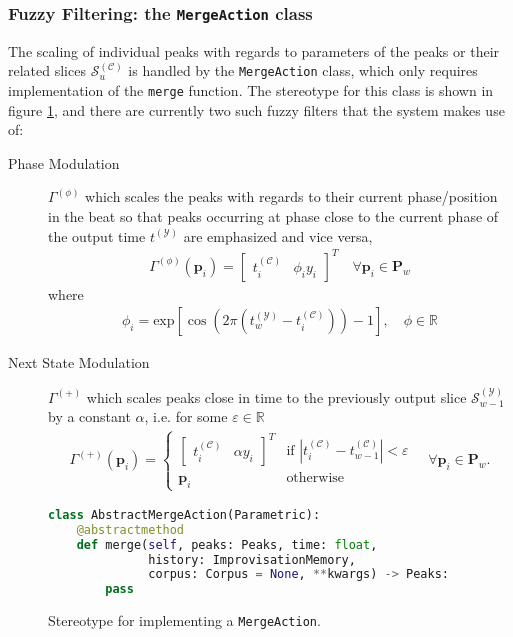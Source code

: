  
 
 \subsubsection{Fuzzy Filtering: the \texttt{MergeAction} class}\label{sec:4-main-architecture-mergeactions}
 The scaling of individual peaks with regards to parameters of the peaks or their related slices $\mathcal S^{(\mathcal C)}_u$ is handled by the \texttt{MergeAction} class, which only requires implementation of the \texttt{merge} function. The stereotype for this class is shown in figure \ref{fig:4-main-architecture-mergeaction}, and there are currently two such fuzzy filters that the system makes use of: 
\begin{description}
	\item[Phase Modulation] $\Gamma^{(\phi)}$ which scales the peaks with regards to their current phase/position in the beat so that peaks occurring at phase close to the current phase of the output time $t^{(\mathcal Y)}$ are emphasized and vice versa,
	\begin{align}
			\Gamma^{(\phi)}\left(\bm p_i\right) = \begin{bmatrix} t^{(\mathcal C)}_i & \phi_i y_i\end{bmatrix}^T
			\quad \forall \bm p_i \in \bm P_w	
	\end{align}
	 where
	 \begin{align}
 		\phi_i = \text{exp}\left[\cos\left(2\pi \left(t_w^{(\mathcal Y)} - t_i^{(\mathcal C)}\right)\right)-1\right], \quad \phi \in \mathbb R
	 \end{align}
	
	\item[Next State Modulation] $\Gamma^{(+)}$ which scales peaks close in time to the previously output slice $\mathcal S^{(\mathcal Y)}_{w-1}$ by a constant $\alpha$, i.e. for some $\varepsilon \in \mathbb R$
	\begin{align}
		\Gamma^{(+)}(\bm p_i) = \left\lbrace \begin{array}{ll} \begin{bmatrix} t^{(\mathcal C)}_i & \alpha y_i \end{bmatrix}^T & \text{if } \left\lvert t^{(\mathcal{C})}_i - t^{(\mathcal C)}_{w-1} \right\rvert < \varepsilon
		\\[0.24cm]
		\bm p_i & \text{otherwise}
		\end{array}\right. \quad \forall \bm p_i \in \bm P_w.
	\end{align}
\end{description}

 \begin{figure}
 	\begin{lstlisting}[language=Python]
class AbstractMergeAction(Parametric):
   	@abstractmethod
   	def merge(self, peaks: Peaks, time: float, 
     		  history: ImprovisationMemory, 
    		  corpus: Corpus = None, **kwargs) -> Peaks:
  	    pass
 	\end{lstlisting}
 	\caption{Stereotype for implementing a \texttt{MergeAction}.}
 	\label{fig:4-main-architecture-mergeaction}
 \end{figure}

